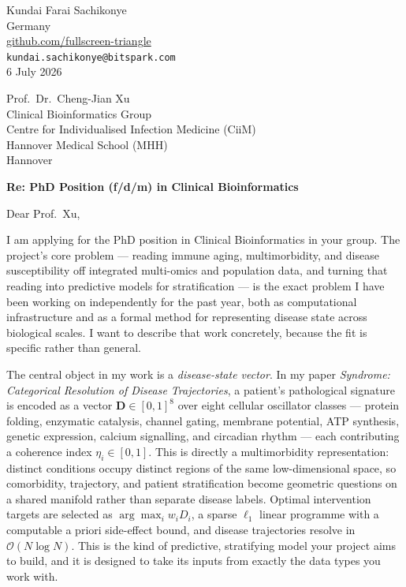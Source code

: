 \documentclass[12pt,a4paper]{article}
\begin{document}
\begin{flushright}
Kundai Farai Sachikonye \\
Germany \\
\href{https://github.com/fullscreen-triangle}{github.com/fullscreen-triangle} \\
\texttt{kundai.sachikonye@bitspark.com} \\[6pt]
6 July 2026
\end{flushright}

\vspace{1em}

Prof.\ Dr.\ Cheng-Jian Xu \\
Clinical Bioinformatics Group \\
Centre for Individualised Infection Medicine (CiiM) \\
Hannover Medical School (MHH) \\
Hannover

\vspace{1.5em}

\textbf{Re: PhD Position (f/d/m) in Clinical Bioinformatics}

\vspace{1em}

Dear Prof.\ Xu,

I am applying for the PhD position in Clinical Bioinformatics in your group.
The project's core problem --- reading immune aging, multimorbidity, and disease
susceptibility off integrated multi-omics and population data, and turning that
reading into predictive models for stratification --- is the exact problem I have
been working on independently for the past year, both as computational
infrastructure and as a formal method for representing disease state across
biological scales. I want to describe that work concretely, because the fit is
specific rather than general.

The central object in my work is a \emph{disease-state vector}. In my paper
\textit{Syndrome: Categorical Resolution of Disease Trajectories}, a patient's
pathological signature is encoded as a vector $\mathbf{D}\in[0,1]^8$ over eight
cellular oscillator classes --- protein folding, enzymatic catalysis, channel
gating, membrane potential, ATP synthesis, genetic expression, calcium
signalling, and circadian rhythm --- each contributing a coherence index
$\eta_i\in[0,1]$. This is directly a multimorbidity representation: distinct
conditions occupy distinct regions of the same low-dimensional space, so
comorbidity, trajectory, and patient stratification become geometric questions
on a shared manifold rather than separate disease labels. Optimal intervention
targets are selected as $\arg\max_i w_i D_i$, a sparse $\ell_1$ linear programme
with a computable a priori side-effect bound, and disease trajectories resolve in
$\mathcal{O}(N\log N)$. This is the kind of predictive, stratifying model your
project aims to build, and it is designed to take its inputs from exactly the data
types you work with.
\end{document}

